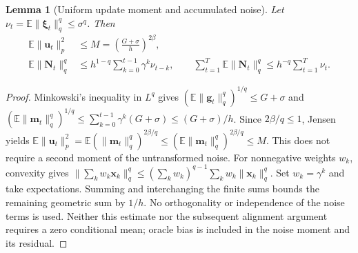 \documentclass{article}
\newtheorem{lemma}{Lemma}
\begin{document}
\begin{lemma}[Uniform update moment and accumulated noise]\label{lemma:momentum_bound}
Let $\nu_t=\mathbb E\|\bm{\xi}_t\|_q^q\le\sigma^q$. Then
\begin{align}
\mathbb E\|\mathbf{u}_t\|_p^2&\le M=\left(\frac{G+\sigma}{h}\right)^{2\beta},\label{eq:update-moment}\\
\mathbb E\|\mathbf{N}_t\|_q^q&\le h^{1-q}\sum_{k=0}^{t-1}\gamma^k\nu_{t-k},\qquad
\sum_{t=1}^T\mathbb E\|\mathbf{N}_t\|_q^q\le h^{-q}\sum_{t=1}^T\nu_t.\label{eq:noise-moment}
\end{align}
\end{lemma}
\begin{proof}
Minkowski's inequality in $L^q$ gives $(\mathbb E\|\mathbf{g}_t\|_q^q)^{1/q}\le G+\sigma$ and
$(\mathbb E\|\mathbf{m}_t\|_q^q)^{1/q}\le\sum_{k=0}^{t-1}\gamma^k(G+\sigma)\le(G+\sigma)/h$.
Since $2\beta/q\le1$, Jensen yields
$\mathbb E\|\mathbf{u}_t\|_p^2=\mathbb E(\|\mathbf{m}_t\|_q^q)^{2\beta/q}\le(\mathbb E\|\mathbf{m}_t\|_q^q)^{2\beta/q}\le M$.
This does not require a second moment of the untransformed noise.
For nonnegative weights $w_k$, convexity gives
$\|\sum_k w_k\mathbf{x}_k\|_q^q\le(\sum_k w_k)^{q-1}\sum_k w_k\|\mathbf{x}_k\|_q^q$.
Set $w_k=\gamma^k$ and take expectations. Summing and interchanging the finite sums bounds the remaining geometric sum by $1/h$. No orthogonality or independence of the noise terms is used. Neither this estimate nor the subsequent alignment argument requires a zero conditional mean; oracle bias is included in the noise moment and its residual.
\end{proof}
\end{document}
